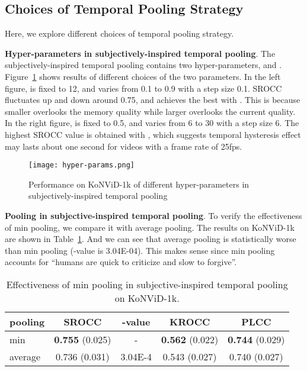 \documentclass[sigconf]{acmart}
\begin{document}
\subsection{Choices of Temporal Pooling Strategy}
Here, we explore different choices of temporal pooling strategy.

\textbf{Hyper-parameters in subjectively-inspired temporal pooling}. The subjectively-inspired temporal pooling contains two hyper-parameters,  and . Figure~\ref{fig:hyper-params} shows results of different choices of the two parameters. In the left figure,  is fixed to 12, and  varies from 0.1 to 0.9 with a step size 0.1. SROCC fluctuates up and down around 0.75, and achieves the best with . This is because smaller  overlooks the memory quality while larger  overlooks the current quality. In the right figure,  is fixed to 0.5, and  varies from 6 to 30 with a step size 6. The highest SROCC value is obtained with , which suggests temporal hysteresis effect may lasts about one second for videos with a frame rate of 25fps.

\begin{figure}[!htb]
\begin{center}
  \texttt{[image: hyper-params.png]}
\end{center}
   \caption{Performance on KoNViD-1k of different hyper-parameters in subjectively-inspired temporal pooling}
\label{fig:hyper-params}
\end{figure}

\textbf{Pooling in subjective-inspired temporal pooling}. To verify the effectiveness of min pooling, we compare it with average pooling. The results on KoNViD-1k are shown in Table~\ref{tab:min-pooling}. And we can see that average pooling is statistically worse than min pooling (-value is 3.04E-04). This makes sense since min pooling accounts for ``humans are quick to criticize and slow to forgive''.

\begin{table}[!hbt]
    \centering
    \caption{Effectiveness of min pooling in subjective-inspired temporal pooling on KoNViD-1k.}
    \label{tab:min-pooling}
    \begin{small}
    \begin{tabular}{lcccc}
    \toprule
    pooling & SROCC & -value & KROCC & PLCC \\
    \midrule
    min & \textbf{0.755} (0.025) & - & \textbf{0.562} (0.022) & \textbf{0.744} (0.029) \\
    average & 0.736 (0.031) & 3.04E-4 & 0.543 (0.027) & 0.740 (0.027)  \\
    \bottomrule
    \end{tabular}
    \end{small}
    
\end{table}
\end{document}
